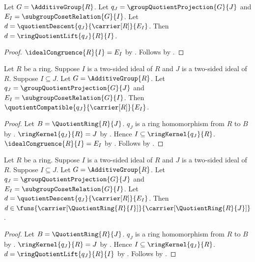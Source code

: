 \begin{proposition}\label{ring_quotient_comparison_eq_ring_quotient_lift}
    Let $G=\AdditiveGroup{R}$.
    Let $q_J=\groupQuotientProjection{G}{J}$ and
        $E_I=\subgroupCosetRelation{G}{I}$.
    Let $d=\quotientDescent{q_J}{\carrier[R]}{E_I}$.
    Then $d=\ringQuotientLift{q_J}{R}{I}$.
\end{proposition}
\begin{proof}
    $\idealCongruence{R}{I}=E_I$ by
        .
    Follows by .
\end{proof}

\begin{theorem}\label{ring_quotient_comparison_compatible}
    Let $R$ be a ring.
    Suppose $I$ is a two-sided ideal of $R$ and
        $J$ is a two-sided ideal of $R$.
    Suppose $I\subseteq J$.
    Let $G=\AdditiveGroup{R}$.
    Let $q_J=\groupQuotientProjection{G}{J}$ and
        $E_I=\subgroupCosetRelation{G}{I}$.
    Then $\quotientCompatible{q_J}{\carrier[R]}{E_I}$.
\end{theorem}
\begin{proof}
    Let $B=\QuotientRing{R}{J}$.
    $q_J$ is a ring homomorphism from $R$ to $B$ by
        .
    $\ringKernel{q_J}{R}=J$ by
        .
    Hence $I\subseteq\ringKernel{q_J}{R}$.
    $\idealCongruence{R}{I}=E_I$ by
        .
    Follows by .
\end{proof}

\begin{proposition}\label{ring_quotient_comparison_type}
    Let $R$ be a ring.
    Suppose $I$ is a two-sided ideal of $R$ and
        $J$ is a two-sided ideal of $R$.
    Suppose $I\subseteq J$.
    Let $G=\AdditiveGroup{R}$.
    Let $q_J=\groupQuotientProjection{G}{J}$ and
        $E_I=\subgroupCosetRelation{G}{I}$.
    Let $d=\quotientDescent{q_J}{\carrier[R]}{E_I}$.
    Then $d\in\funs{\carrier[\QuotientRing{R}{I}]}{
        \carrier[\QuotientRing{R}{J}]}$.
\end{proposition}
\begin{proof}
    Let $B=\QuotientRing{R}{J}$.
    $q_J$ is a ring homomorphism from $R$ to $B$ by
        .
    $\ringKernel{q_J}{R}=J$ by
        .
    Hence $I\subseteq\ringKernel{q_J}{R}$.
    $d=\ringQuotientLift{q_J}{R}{I}$ by
        .
    Follows by .
\end{proof}

